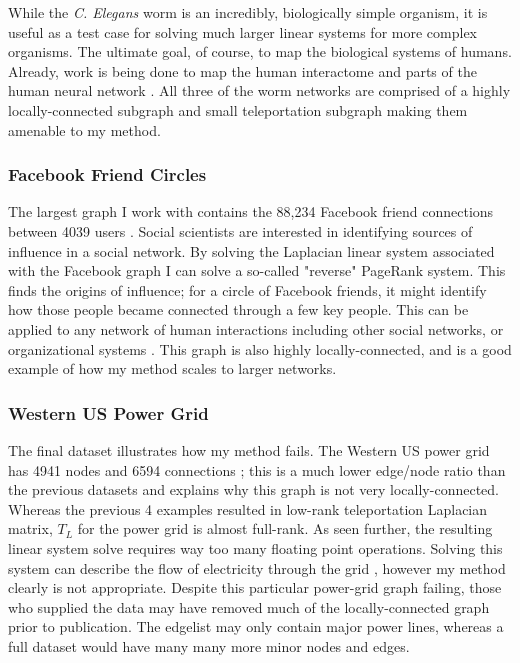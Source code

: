 \documentclass{article}
\begin{document}
While the \textit{C. Elegans} worm is an incredibly, biologically simple organism, it is useful as a test case for solving much larger linear systems for more complex organisms. The ultimate goal, of course, to map the biological systems of humans. Already, work is being done to map the human interactome \cite{Rual:2005,Rolland:2014} and parts of the human neural network \cite{Toga:2012}. All three of the worm networks are comprised of a highly locally-connected subgraph and small teleportation subgraph making them amenable to my method. 

\subsubsection{Facebook Friend Circles}
The largest graph I work with contains the 88,234 Facebook friend connections between 4039 users  \cite{Mcauley:2012}. Social scientists are interested in identifying sources of influence in a social network. By solving the Laplacian linear system associated with the Facebook graph I can solve a so-called "reverse" PageRank system. This finds the origins of influence; for a circle of Facebook friends, it might identify how those people became connected through a few key people. This can be applied to any network of human interactions including other social networks, or organizational systems \cite{Gleich:2015}. This graph is also highly locally-connected, and is a good example of how my method scales to larger networks.


\subsubsection{Western US Power Grid}
The final dataset illustrates how my method fails. The Western US power grid has 4941 nodes and 6594 connections \cite{Watts:1998}; this is a much lower edge/node ratio than the previous datasets and explains why this graph is not very locally-connected. Whereas the previous 4 examples resulted in low-rank teleportation Laplacian matrix, $T_L$ for the power grid is almost full-rank. As seen further, the resulting linear system solve requires way too many floating point operations. Solving this system can describe the flow of electricity through the grid \cite{Pagani:2013}, however my method clearly is not appropriate. Despite this particular power-grid graph failing, those who supplied the data may have removed much of the locally-connected graph prior to publication. The edgelist may only contain major power lines, whereas a full dataset would have many many more minor nodes and edges.
\end{document}
